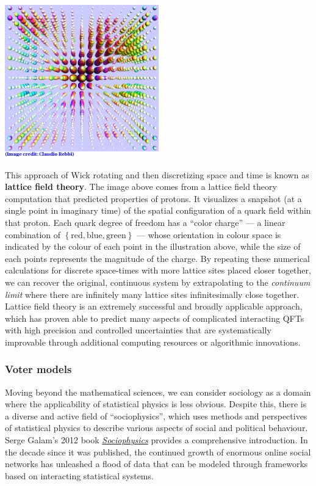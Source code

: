 \begin{center}\includegraphics[width=0.5\textwidth]{figs/unit10_lattice.pdf}\end{center}

This approach of Wick rotating and then discretizing space and time is known as \textbf{lattice field theory}.
The image above comes from a lattice field theory computation that predicted properties of protons.
It visualizes a snapshot (at a single point in imaginary time) of the spatial configuration of a quark field within that proton.
Each quark degree of freedom has a ``color charge'' --- a linear combination of $\left\{\mbox{red}, \mbox{blue}, \mbox{green}\right\}$ --- whose orientation in colour space is indicated by the colour of each point in the illustration above, while the size of each points represents the magnitude of the charge.
By repeating these numerical calculations for discrete space-times with more lattice sites placed closer together, we can recover the original, continuous system by extrapolating to the  \textit{continuum limit} where there are infinitely many lattice sites infinitesimally close together.
Lattice field theory is an extremely successful and broadly applicable approach, which has proven able to predict many aspects of complicated interacting QFTs with high precision and controlled uncertainties that are systematically improvable through additional computing resources or algorithmic innovations.

\subsubsection*{Voter models}
Moving beyond the mathematical sciences, we can consider sociology as a domain where the applicability of statistical physics is less obvious.
Despite this, there is a diverse and active field of ``sociophysics'', which uses methods and perspectives of statistical physics to describe various aspects of social and political behaviour.
Serge Galam's 2012 book \href{https://liverpool.idm.oclc.org/login?url=http://dx.doi.org/10.1007/978-1-4614-2032-3}{\textit{Sociophysics}} provides a comprehensive introduction.
In the decade since it was published, the continued growth of enormous online social networks has unleashed a flood of data that can be modeled through frameworks based on interacting statistical systems.

